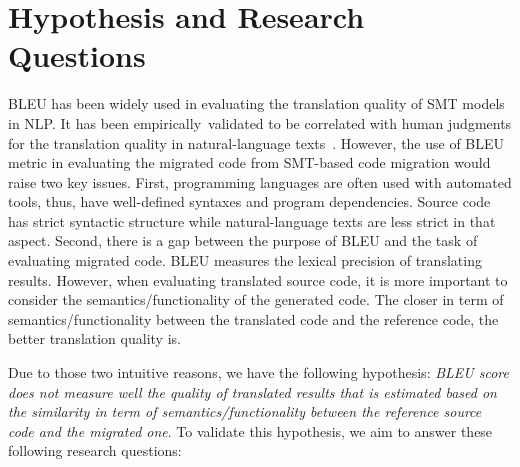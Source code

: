 \section{Hypothesis and Research Questions}

BLEU has been widely used in evaluating the translation quality of SMT
models in NLP. It has been empirically~validated to be correlated with
human judgments for the translation quality in natural-language
texts~\cite{Papineni2002}.
%
%
However, the use of BLEU metric in evaluating the migrated code from
SMT-based code migration would raise two key issues. First,
programming languages are often used with automated tools, thus, have
well-defined syntaxes and program dependencies. Source code has strict
syntactic structure while natural-language texts are less strict in
that aspect.
%
%
Second, there is a gap between the purpose of BLEU and the task of
evaluating migrated code. BLEU measures the lexical precision of
translating results. However, when evaluating translated source code,
it is more important to consider the semantics/functionality of
the generated code.
%
The closer in term of semantics/functionality between the translated
code and the reference code, the better translation quality is.
%

Due to those two intuitive reasons, we have the following hypothesis:
{\em BLEU score does not measure well the quality of translated results
that is estimated based on the similarity in term of
semantics/functionality between the reference source code and the migrated one}. To validate
this hypothesis, we aim to answer these following research questions:
%

